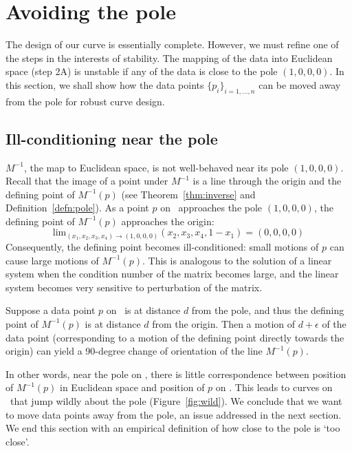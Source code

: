 \section{Avoiding the pole}
\label{sec:avoid}

The design of our curve is essentially complete.
However, we must refine one of the steps in the interests of stability.
The mapping of the data into Euclidean space (step 2A) is unstable
if any of the data is close to the pole $(1,0,0,0)$.
In this section, we shall show how the data points $\{p_i\}_{i=1,\ldots,n}$
can be moved away from the pole for robust curve design.

\subsection{Ill-conditioning near the pole}
\label{sec:ill}

$M^{-1}$, the map to Euclidean space, is not well-behaved near 
its pole $(1,0,0,0)$.
Recall that the image of a point under $M^{-1}$ is a line through the
origin and the defining point of $M^{-1}(p)$ (see Theorem~\ref{thm:inverse} 
and Definition~\ref{defn:pole}).
As a point $p$ on \ approaches the pole $(1,0,0,0)$,
the defining point of $M^{-1}(p)$ approaches the origin:
\[ 
\mbox{lim}_{(x_1,x_2,x_3,x_4) \rightarrow (1,0,0,0)} (x_2,x_3,x_4,1-x_1)
= (0,0,0,0) 
\]
Consequently, the defining point becomes ill-conditioned:
small motions of $p$ can cause large motions of $M^{-1}(p)$.
This is analogous to the solution of a linear
system when the condition number of the matrix becomes large,
and the linear system becomes very sensitive to perturbation of the matrix.

\begin{example}
Suppose a data point $p$ on \ is at distance $d$ from the pole,
and thus the defining point of $M^{-1}(p)$ is at distance $d$ from the
origin.
Then a motion of $d+\epsilon$ of the data point (corresponding to a motion
of the defining point directly towards the origin) can yield
a 90-degree change of orientation of the line $M^{-1}(p)$.
\end{example}

In other words, near the pole on , there is little correspondence 
between position of $M^{-1}(p)$ in Euclidean space 
and position of $p$ on .
This leads to curves on \ that jump wildly about the pole 
(Figure~\ref{fig:wild}).
We conclude that we want to move data points away from the pole,
an issue addressed in the next section.
We end this section with an empirical definition of how close to the pole
is `too close'.


